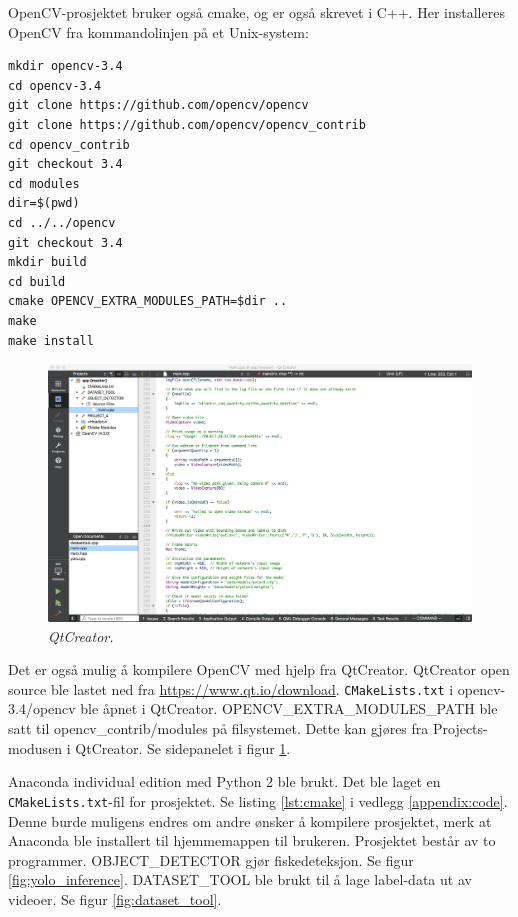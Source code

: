 OpenCV-prosjektet bruker også cmake, og er også skrevet i C++. Her installeres OpenCV fra kommandolinjen på et Unix-system:

\begin{verbatim}
mkdir opencv-3.4
cd opencv-3.4
git clone https://github.com/opencv/opencv
git clone https://github.com/opencv/opencv_contrib
cd opencv_contrib
git checkout 3.4
cd modules
dir=$(pwd)
cd ../../opencv
git checkout 3.4
mkdir build
cd build
cmake OPENCV_EXTRA_MODULES_PATH=$dir ..
make
make install
\end{verbatim}

\begin{figure}
\begin{center} 
\includegraphics[scale=0.2]{figures/qtcreator}
\caption{\small \sl QtCreator. \label{fig:qtcreator}} 
\end{center} 
\end{figure} 

Det er også mulig å kompilere OpenCV med hjelp fra QtCreator. QtCreator open source ble lastet ned fra \url{https://www.qt.io/download}. \texttt{CMakeLists.txt} i opencv-3.4/opencv ble åpnet i QtCreator. OPENCV\_EXTRA\_MODULES\_PATH ble satt til opencv\_contrib/modules på filsystemet. Dette kan gjøres fra Projects-modusen i QtCreator. Se sidepanelet i figur \ref{fig:qtcreator}.

Anaconda individual edition med Python 2 ble brukt. Det ble laget en \texttt{CMakeLists.txt}-fil for prosjektet. Se listing \ref{lst:cmake} i vedlegg \ref{appendix:code}. Denne burde muligens endres om andre ønsker å kompilere prosjektet, merk at Anaconda ble installert til hjemmemappen til brukeren. Prosjektet består av to programmer. OBJECT\_DETECTOR gjør fiskedeteksjon. Se figur \ref{fig:yolo_inference}. DATASET\_TOOL ble brukt til å lage label-data ut av videoer. Se figur \ref{fig:dataset_tool}.

